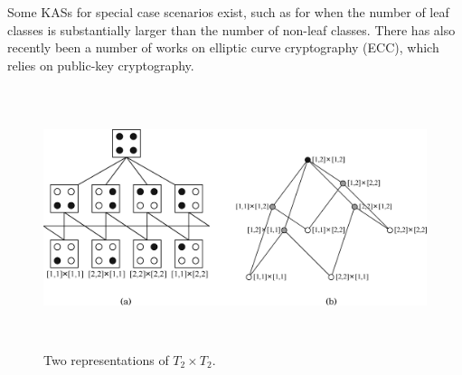 \documentclass[12pt, titlepage]{article}
\begin{document}
Some KASs for special case scenarios exist, such as for when the number of leaf classes is substantially larger than the number of non-leaf classes.\cite{largeLeaf} There has also recently been a number of works on elliptic curve cryptography (ECC)\cite{ecc1}\cite{ecc2}, which relies on public-key cryptography.

\begin{figure}
\centerline{\includegraphics[height=3.0in,width=6in,angle=0]{geospatial.pdf}}
\caption{Two representations of $T_{2} \times T_{2}$.\cite{mainPaper}}
\label{fig:geospatial}
\end{figure}
\end{document}
